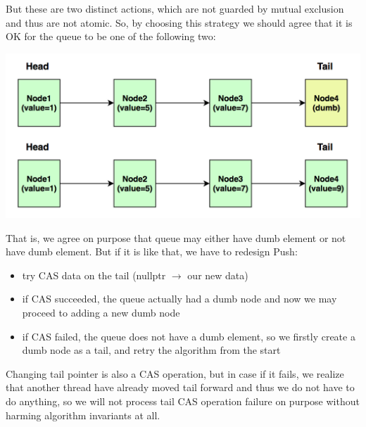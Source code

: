 \documentclass{article}
\begin{document}
But these are two distinct actions, which are not guarded by mutual exclusion and thus are not atomic. So, by choosing this strategy we should agree that it is OK for the queue to be one of the following two:

\begin{center}\includegraphics[width=0.5 \textwidth]{image5.png}\end{center}

That is, we agree on purpose that queue may either have dumb element or not have dumb element. But if it is like that, we have to redesign Push:

\begin{itemize}
	\item try CAS data on the tail (nullptr $\rightarrow$ our new data)
	\item if CAS succeeded, the queue actually had a dumb node and now we may proceed to adding a new dumb node
	\item if CAS failed, the queue does not have a dumb element, so we firstly create a dumb node as a tail, and retry the algorithm from the start
\end{itemize}


Changing tail pointer is also a CAS operation, but in case if it fails, we realize that another thread have already moved tail forward and thus we do not have to do anything, so we will not process tail CAS operation failure on purpose without harming algorithm invariants at all.
\end{document}
